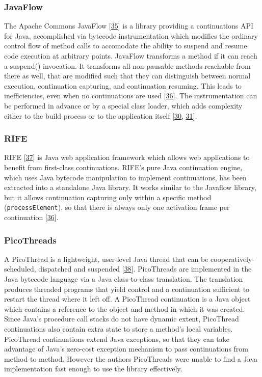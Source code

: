\documentclass[12pt,a4paper,oneside,openright]{book}
\begin{document}
\subsubsection{JavaFlow}\label{javaflow}

The Apache Commons JavaFlow {[}\hyperref[ref-Javaflow2015]{35}{]} is a
library providing a continuations API for Java, accomplished via
bytecode instrumentation which modifies the ordinary control flow of
method calls to accomodate the ability to suspend and resume code
execution at arbitrary points. JavaFlow transforms a method if it can
reach a suspend() invocation. It transforms all non-pausable methods
reachable from there as well, that are modified such that they can
distinguish between normal execution, continuation capturing, and
continuation resuming. This leads to inefficiencies, even when no
continuations are used {[}\hyperref[ref-Stadler2009]{36}{]}. The
instrumentation can be performed in advance or by a special class
loader, which adds complexity either to the build process or to the
application itself {[}\hyperref[ref-Srinivasan2006]{30},
\hyperref[ref-Bolton2000]{31}{]}.

\subsubsection{RIFE}\label{rife}

RIFE {[}\hyperref[ref-RIFE2015]{37}{]} is Java web application framework
which allows web applications to benefit from first-class continuations.
RIFE's pure Java continuation engine, which uses Java bytecode
manipulation to implement continuations, has been extracted into a
standalone Java library. It works similar to the Javaflow library, but
it allows continuation capturing only within a specific method
(\texttt{processElement}), so that there is always only one activation
frame per continuation {[}\hyperref[ref-Stadler2009]{36}{]}.

\subsubsection{PicoThreads}\label{picothreads}

A PicoThread is a lightweight, user-level Java thread that can be
cooperatively-scheduled, dispatched and suspended
{[}\hyperref[ref-begel2000picothreads]{38}{]}. PicoThreads are
implemented in the Java bytecode language via a Java class-to-class
translation. The translation produces threaded programs that yield
control and a continuation sufficient to restart the thread where it
left off. A PicoThread continuation is a Java object which contains a
reference to the object and method in which it was created. Since Java's
procedure call stacks do not have dynamic extent, PicoThread
continuations also contain extra state to store a method's local
variables. PicoThread continuations extend Java exceptions, so that they
can take advantage of Java's zero-cost exception mechanism to pass
continuations from method to method. However the authors PicoThreads
were unable to find a Java implementation fast enough to use the library
effectively.
\end{document}
